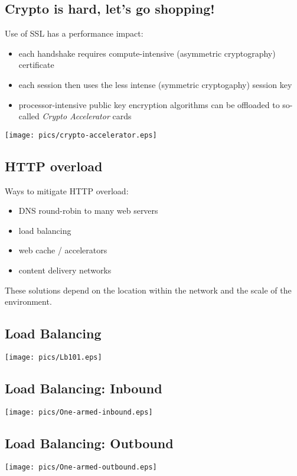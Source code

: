 \documentclass[xga]{xdvislides}
\begin{document}
\subsection{Crypto is hard, let's go shopping!}
Use of SSL has a performance impact:
\begin{itemize}
	\item each handshake requires compute-intensive (asymmetric
		cryptography) certificate
	\item each session then uses the less intense (symmetric
		cryptogaphy) session key
	\item processor-intensive public key encryption algorithms can be
		offloaded to so-called {\em Crypto Accelerator} cards
\end{itemize}
\begin{center}
	\texttt{[image: pics/crypto-accelerator.eps]}
\end{center}

\subsection{HTTP overload}
Ways to mitigate HTTP overload:

\begin{itemize}
	\item DNS round-robin to many web servers
	\item load balancing
	\item web cache / accelerators
	\item content delivery networks
\end{itemize}

These solutions depend on the location within the network and the scale of
the environment.

\subsection{Load Balancing}
\begin{center}
	\texttt{[image: pics/Lb101.eps]}
\end{center}

\subsection{Load Balancing: Inbound}
\begin{center}
	\texttt{[image: pics/One-armed-inbound.eps]}
\end{center}

\subsection{Load Balancing: Outbound}
\begin{center}
	\texttt{[image: pics/One-armed-outbound.eps]}
\end{center}
\end{document}

